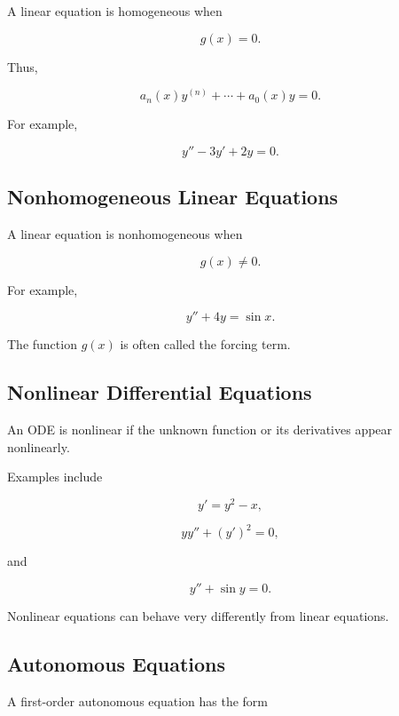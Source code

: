 A linear equation is homogeneous when

\[
\boxed{
g(x)=0.
}
\]

Thus,

\[
\boxed{
a_n(x)y^{(n)}
+
\cdots
+
a_0(x)y
=
0.
}
\]

For example,

\[
\boxed{
y''-3y'+2y=0.
}
\]

\subsection{Nonhomogeneous Linear Equations}
\label{subsec:nonhomogeneous-linear-odes}

A linear equation is nonhomogeneous when

\[
\boxed{
g(x)\neq0.
}
\]

For example,

\[
\boxed{
y''+4y=\sin x.
}
\]

The function \(g(x)\) is often called the forcing term.

\subsection{Nonlinear Differential Equations}
\label{subsec:nonlinear-odes}

An ODE is nonlinear if the unknown function or its derivatives appear
nonlinearly.

Examples include

\[
\boxed{
y'=y^2-x,
}
\]

\[
\boxed{
yy''+(y')^2=0,
}
\]

and

\[
\boxed{
y''+\sin y=0.
}
\]

Nonlinear equations can behave very differently from linear equations.

\subsection{Autonomous Equations}
\label{subsec:autonomous-odes}

A first-order autonomous equation has the form

